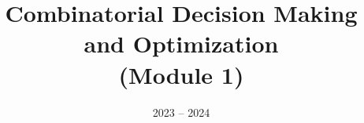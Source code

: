 \documentclass[11pt]{ainotes}
\title{Combinatorial Decision Making\\and Optimization\\(Module 1)}
\date{2023 -- 2024}
\begin{document}
    
    \makenotesfront
    
    
\end{document}
